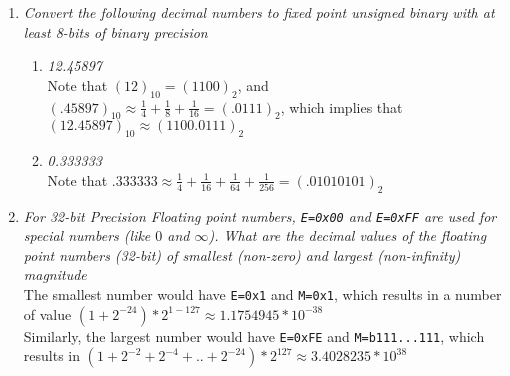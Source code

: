 \documentclass[12pt]{article}
\begin{document}
\begin{enumerate}
\vspace{7mm}
\item \textit{Convert the following decimal numbers to fixed point unsigned binary with at least 8-bits of binary precision}
  \begin{enumerate}
      \item \textit{12.45897} \\
          Note that $(12)_{10} = (1100)_2$, and $(.45897)_{10} \approx \frac{1}{4} + \frac{1}{8} + \frac{1}{16} = (.0111)_2$, which implies that $(12.45897)_{10} \approx \boxed{(1100.0111)_2}$
      \item \textit{0.333333} \\
          Note that $.333333 \approx \frac{1}{4} + \frac{1}{16} + \frac{1}{64} +\frac{1}{256} = \boxed{(.01010101)_2}$
  \end{enumerate}

\newpage
\item \textit{For 32-bit Precision Floating point numbers, {\tt E=0x00} and {\tt E=0xFF} are used for special numbers (like $0$ and $\infty$). What are the decimal values of the floating point numbers (32-bit) of smallest (non-zero) and largest (non-infinity) magnitude} \\

The smallest number would have {\tt E=0x1} and {\tt M=0x1}, which results in a number of value $(1 + 2^{-24}) * 2^{1-127} \approx \boxed{1.1754945 * 10^{-38}}$ \\

Similarly, the largest number would have {\tt E=0xFE} and {\tt M=b111...111}, which results in $(1 + 2^{-2} + 2^{-4} + .. + 2^{-24}) * 2^{127} \approx \boxed{3.4028235 * 10^{38}}$

\end{enumerate}
\end{document}
